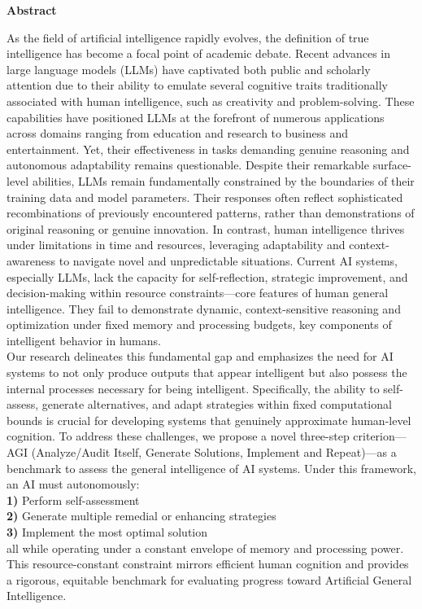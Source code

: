 \documentclass[11pt]{scrartcl}
\begin{document}
\begin{center}
\begin{Huge}
\textbf{Abstract}
\end{Huge}
\end{center}
As the field of artificial intelligence rapidly evolves, the definition of true intelligence has become a focal point of academic debate. Recent advances in large language models (LLMs) have captivated both public and scholarly attention due to their ability to emulate several cognitive traits traditionally associated with human intelligence, such as creativity and problem-solving. These capabilities have positioned LLMs at the forefront of numerous applications across domains ranging from education and research to business and entertainment. Yet, their effectiveness in tasks demanding genuine reasoning and autonomous adaptability remains questionable. Despite their remarkable surface-level abilities, LLMs remain fundamentally constrained by the boundaries of their training data and model parameters. Their responses often reflect sophisticated recombinations of previously encountered patterns, rather than demonstrations of original reasoning or genuine innovation. In contrast, human intelligence thrives under limitations in time and resources, leveraging adaptability and context-awareness to navigate novel and unpredictable situations. Current AI systems, especially LLMs, lack the capacity for self-reflection, strategic improvement, and decision-making within resource constraints—core features of human general intelligence. They fail to demonstrate dynamic, context-sensitive reasoning and optimization under fixed memory and processing budgets, key components of intelligent behavior in humans. \\
Our research delineates this fundamental gap and emphasizes the need for AI systems to not only produce outputs that appear intelligent but also possess the internal processes necessary for being intelligent. Specifically, the ability to self-assess, generate alternatives, and adapt strategies within fixed computational bounds is crucial for developing systems that genuinely approximate human-level cognition. To address these challenges, we propose a novel three-step criterion—AGI (Analyze/Audit Itself, Generate Solutions, Implement and Repeat)—as a benchmark to assess the general intelligence of AI systems. Under this framework, an AI must autonomously: \\
\textbf{1)} Perform self-assessment \\
\textbf{2)} Generate multiple remedial or enhancing strategies \\
\textbf{3)} Implement the most optimal solution \\
all while operating under a constant envelope of memory and processing power. This resource-constant constraint mirrors efficient human cognition and provides a rigorous, equitable benchmark for evaluating progress toward Artificial General Intelligence.
\end{document}
